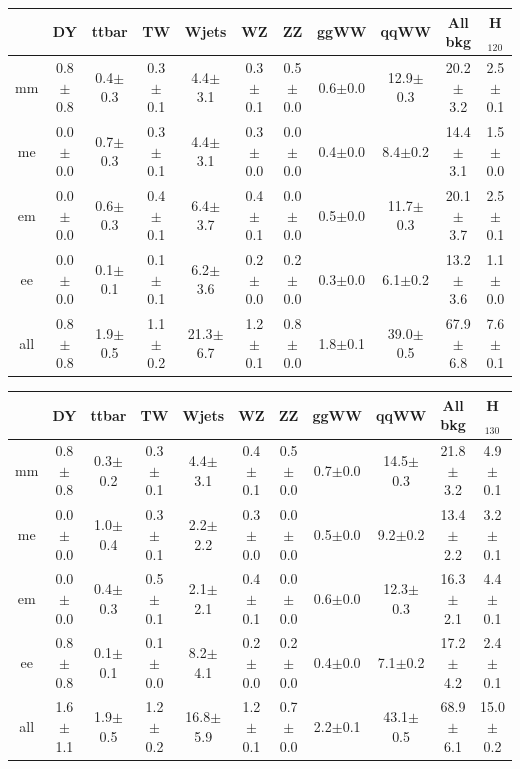 \begin{table}[!ht]
  \begin{center}
 {\footnotesize
  \begin{tabular} {|c|c|c|c|c|c|c|c|c||c||c|}
\hline
  & DY & ttbar & TW & Wjets & WZ & ZZ & ggWW & qqWW & {\bf All bkg} & {\bf H$_{120}$}\\
  \hline
  \hline
  mm &  0.8$\pm$0.8 &  0.4$\pm$0.3 &  0.3$\pm$0.1 &  4.4$\pm$3.1 &  0.3$\pm$0.1 &  0.5$\pm$0.0 &  0.6$\pm$0.0 & 12.9$\pm$0.3 & 20.2$\pm$3.2 & 2.5$\pm$0.1 \\
  me &  0.0$\pm$0.0 &  0.7$\pm$0.3 &  0.3$\pm$0.1 &  4.4$\pm$3.1 &  0.3$\pm$0.0 &  0.0$\pm$0.0 &  0.4$\pm$0.0 &  8.4$\pm$0.2 & 14.4$\pm$3.1 & 1.5$\pm$0.0 \\
  em &  0.0$\pm$0.0 &  0.6$\pm$0.3 &  0.4$\pm$0.1 &  6.4$\pm$3.7 &  0.4$\pm$0.1 &  0.0$\pm$0.0 &  0.5$\pm$0.0 & 11.7$\pm$0.3 & 20.1$\pm$3.7 & 2.5$\pm$0.1 \\
  ee &  0.0$\pm$0.0 &  0.1$\pm$0.1 &  0.1$\pm$0.1 &  6.2$\pm$3.6 &  0.2$\pm$0.0 &  0.2$\pm$0.0 &  0.3$\pm$0.0 &  6.1$\pm$0.2 & 13.2$\pm$3.6 & 1.1$\pm$0.0 \\
 \hline
 all &  0.8$\pm$0.8 &  1.9$\pm$0.5 &  1.1$\pm$0.2 & 21.3$\pm$6.7 &  1.2$\pm$0.1 &  0.8$\pm$0.0 &  1.8$\pm$0.1 & 39.0$\pm$0.5 & 67.9$\pm$6.8 & 7.6$\pm$0.1 \\
 \hline
  \end{tabular}
  }
 {\footnotesize
  \begin{tabular} {|c|c|c|c|c|c|c|c|c||c||c|}
\hline
  & DY & ttbar & TW & Wjets & WZ & ZZ & ggWW & qqWW & {\bf All bkg} & {\bf H$_{130}$}\\
  \hline
  \hline
  mm & 0.8$\pm$0.8 &  0.3$\pm$0.2 &  0.3$\pm$0.1 &  4.4$\pm$3.1 &  0.4$\pm$0.1 &  0.5$\pm$0.0 &  0.7$\pm$0.0 & 14.5$\pm$0.3 & 21.8$\pm$3.2 & 4.9$\pm$0.1 \\
  me & 0.0$\pm$0.0 &  1.0$\pm$0.4 &  0.3$\pm$0.1 &  2.2$\pm$2.2 &  0.3$\pm$0.0 &  0.0$\pm$0.0 &  0.5$\pm$0.0 &  9.2$\pm$0.2 & 13.4$\pm$2.2 & 3.2$\pm$0.1 \\
  em & 0.0$\pm$0.0 &  0.4$\pm$0.3 &  0.5$\pm$0.1 &  2.1$\pm$2.1 &  0.4$\pm$0.1 &  0.0$\pm$0.0 &  0.6$\pm$0.0 & 12.3$\pm$0.3 & 16.3$\pm$2.1 & 4.4$\pm$0.1 \\
  ee & 0.8$\pm$0.8 &  0.1$\pm$0.1 &  0.1$\pm$0.0 &  8.2$\pm$4.1 &  0.2$\pm$0.0 &  0.2$\pm$0.0 &  0.4$\pm$0.0 &  7.1$\pm$0.2 & 17.2$\pm$4.2 & 2.4$\pm$0.1 \\
 \hline
 all & 1.6$\pm$1.1 &  1.9$\pm$0.5 &  1.2$\pm$0.2 & 16.8$\pm$5.9 &  1.2$\pm$0.1 &  0.7$\pm$0.0 &  2.2$\pm$0.1 & 43.1$\pm$0.5 & 68.9$\pm$6.1 & 15.0$\pm$0.2 \\

\end{tabular}}
\end{center}
\end{table}
